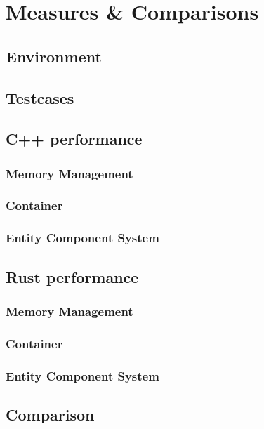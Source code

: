 \chapter{Measures \& Comparisons}
\blindtext
\section{Environment}
\blindtext
\section{Testcases}
\blindtext
\section{C++ performance}
\blindtext
\subsection{Memory Management}
\blindtext
\subsection{Container}
\blindtext
\subsection{Entity Component System}
\blindtext
\section{Rust performance}
\blindtext
\subsection{Memory Management}
\blindtext
\subsection{Container}
\blindtext
\subsection{Entity Component System}
\blindtext
\section{Comparison}
\blindtext